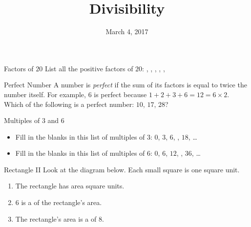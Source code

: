 \documentclass[12pt,letterpaper]{article}
\title{Divisibility}
\date{March 4, 2017}
\begin{document}
\maketitle

\thispagestyle{empty}

\begin{problem}{Factors of \(20\)}
 List all the positive factors of \(20\):
 \blankB, \blankB,
 \blankB, \blankB,
 \blankB, \blankB
\end{problem}

\begin{problem}{Perfect Number}
  A number is \emph{perfect} if the sum of its factors is equal to twice the
  number itself. For example, \(6\) is perfect because \(1+2+3+6=12=6\times2\).
  Which of the following is a perfect number: \(10\), \(17\), \(28\)?
\end{problem}

\begin{problem}{Multiples of \(3\) and \(6\)}
 \begin{itemize}
  \item Fill in the blanks in this list of multiples of \(3\): \(0\), \(3\),
  \(6\), ,
  \(18\), \ldots

  \item Fill in the blanks in this list of multiples of \(6\): \(0\), \(6\),
  \(12\), ,
  \(36\), \ldots
 \end{itemize}
\end{problem}

\begin{problem}{Rectangle II}
 Look at the diagram below. Each small square is one square unit.

 \begin{center}
 \end{center}

 \begin{enumerate}
  \item The rectangle has area  square units.
  \item \(6\) is a  of the
  rectangle's area.
  \item The rectangle's area is a
   of \(8\).
 \end{enumerate}
\end{problem}
\end{document}
